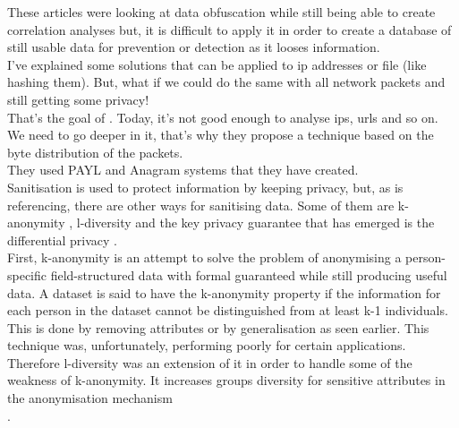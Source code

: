 \documentclass{eplmastersthesis}
\begin{document}
These articles were looking at data obfuscation while still being able to create correlation analyses but, it is difficult to apply it in order to create a database of still usable data for prevention or detection as it looses information.
\\

I've explained some solutions that can be applied to \gls{ip} addresses or file (like hashing them). But, what if we could do the same with all network packets and still getting some privacy!\\
That's the goal of \cite{parekh2006privacy}. Today, it's not good enough to analyse \gls{ip}s, \gls{url}s and so on. We need to go deeper in it, that's why they propose a technique based on the byte distribution of the packets.\\
They used PAYL and Anagram \cite{wang2006network} systems that they have created.\\

Sanitisation is used to protect information by keeping privacy, but, as \cite{mohaisen2017rethinking} is referencing, there are other ways for sanitising data. Some of them are k-anonymity \cite{sweeney2002k}, l-diversity \cite{machanavajjhala2007diversity} and the key privacy guarantee that has emerged is the differential privacy \cite{dwork2008differential}.\\
First, k-anonymity is an attempt to solve the problem of anonymising a person-specific field-structured data with formal guaranteed while still producing useful data. A dataset is said to have the k-anonymity property if the information for each person in the dataset cannot be distinguished from at least k-1 individuals. This is done by removing attributes or by generalisation as seen earlier. This technique was, unfortunately, performing poorly for certain applications. Therefore l-diversity was an extension of it in order to handle some of the weakness of k-anonymity. It increases groups diversity for sensitive attributes in the anonymisation mechanism\\.
\end{document}
